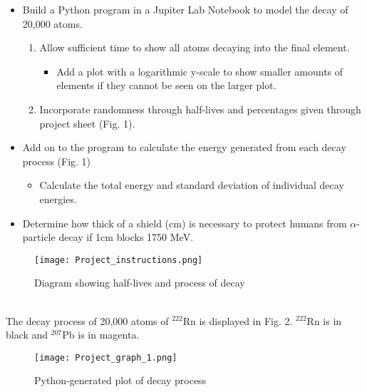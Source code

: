 \documentclass[12pt]{article}
\begin{document}
\begin{itemize} 
\item Build a Python program in a Jupiter Lab Notebook to model the decay of 20,000 atoms.                                     
\begin{enumerate}         
\item Allow sufficient time to show all atoms decaying into the final element.                          
\begin{itemize}     
\item Add a plot with a logarithmic y-scale to show smaller amounts of elements if they cannot be seen on the larger plot.         %
\end{itemize} 
\item Incorporate randomness through half-lives and percentages given through project sheet (Fig. 1).                          
\end{enumerate}    
\item Add on to the program to calculate the energy generated from each decay process (Fig. 1)                      
\begin{itemize}
\item Calculate the total energy and standard deviation of individual decay energies.              
\end{itemize} 
\item Determine how thick of a shield (cm) is necessary to protect humans from $\alpha$-particle decay if 1cm blocks 1750 MeV.     
\end{itemize}   
\begin{figure}
    \centering
    \texttt{[image: Project\_instructions.png]}
    \caption{Diagram showing half-lives and process of decay}
    \label{fig:enter-label}
\end{figure} 


\clearpage %
\vskip0.1in
\\

\indent The decay process of 20,000 atoms of $^{222}$Rn is displayed in Fig. 2. $^{222}$Rn is in black and $^{207}$Pb \indent is in magenta.\\
\begin{figure}[hbt!]
    \centering
    \texttt{[image: Project\_graph\_1.png]}
    \caption{Python-generated plot of decay process}
    \label{fig:enter-label}
\end{figure}
\\
\end{document}
